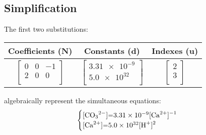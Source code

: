 \documentclass{article}
\newcommand{\matr}[1]{\bm{#1}}
\newcommand{\vect}[1]{\bm{#1}}
\begin{document}
\subsection{Simplification}
The first two substitutions:
\begin{center}
    \begin{tabular}{c|c|c}
    Coefficients ($\matr{N}$) & Constants ($\vect{d}$)  & Indexes ($\vect{u}$)  \\
    \hline
    $\begin{bmatrix}
        0 & 0 & -1 \\
       2 & 0 & 0 \\
    \end{bmatrix}$  &
    $\begin{bmatrix}
        \num{3.31e-9} \\
       \num{5.0e32} \\
    \end{bmatrix}$  &
    $\begin{bmatrix}
        2 \\
       3 \\
    \end{bmatrix}$
\end{tabular}
\end{center}
algebraically represent the simultaneous equations:
\begin{equation*}
    \begin{cases}
    \ce{[CO3^2-]=\num{3.31e-9}[Ca^2+]^{-1}} \\
    \ce{[Ca^2+]=\num{5.0e32}[H+]^2}
    \end{cases}
\end{equation*}
\end{document}
